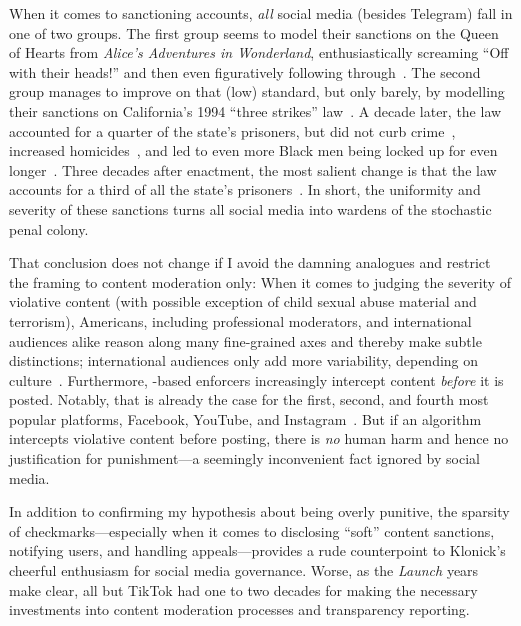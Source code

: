 When it comes to sanctioning accounts, \emph{all} social media (besides
Telegram) fall in one of two groups. The first group seems to model their
sanctions on the Queen of Hearts from \emph{Alice's Adventures in Wonderland},
enthusiastically screaming ``Off with their heads!'' and then even figuratively
following through~\cite{Carroll2008}. The second group manages to improve on
that (low) standard, but only barely, by modelling their sanctions on
California's 1994 ``three strikes'' law~\cite{Vitiello2002}. A decade later, the
law accounted for a quarter of the state's prisoners, but did not curb
crime~\cite{BrownJolivette2005}, increased homicides~\cite{MarvellMoody2001},
and led to even more Black men being locked up for even
longer~\cite{BrownJolivette2005}. Three decades after enactment, the most
salient change is that the law accounts for a third of all the state's
prisoners~\cite{BirdGillea2022}. In short, the uniformity and severity of these
sanctions turns all social media into wardens of the stochastic penal colony.

That conclusion does not change if I avoid the damning analogues and restrict
the framing to content moderation only: When it comes to judging the severity of
violative content (with possible exception of child sexual abuse material and
terrorism), Americans, including professional moderators, and international
audiences alike reason along many fine-grained axes and thereby make subtle
distinctions; international audiences only add more variability, depending on
culture~\cite{JiangScheuermanea2021,ScheuermanJiangea2021}. Furthermore,
\AI-based enforcers increasingly intercept content \emph{before} it is posted.
Notably, that is already the case for the first, second, and fourth most popular
platforms, Facebook, YouTube, and Instagram~\cite{Lua2022}. But if an algorithm
intercepts violative content before posting, there is \emph{no} human harm and
hence no justification for punishment---a seemingly inconvenient fact ignored
by social media.

In addition to confirming my hypothesis about being overly punitive, the
sparsity of checkmarks---especially when it comes to disclosing ``soft''
content sanctions, notifying users, and handling appeals---provides a rude
counterpoint to Klonick's cheerful enthusiasm for social media governance.
Worse, as the \emph{Launch} years make clear, all but TikTok had one to two
decades for making the necessary investments into content moderation processes
and transparency reporting.

